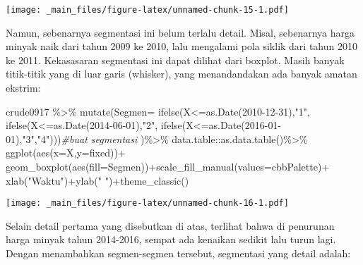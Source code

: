 \documentclass[
]{book}
\newenvironment{Shaded}{\begin{snugshade}}{\end{snugshade}}
\newcommand{\AttributeTok}[1]{\textcolor[rgb]{0.77,0.63,0.00}{#1}}
\newcommand{\CommentTok}[1]{\textcolor[rgb]{0.56,0.35,0.01}{\textit{#1}}}
\newcommand{\FunctionTok}[1]{\textcolor[rgb]{0.00,0.00,0.00}{#1}}
\newcommand{\NormalTok}[1]{#1}
\newcommand{\SpecialCharTok}[1]{\textcolor[rgb]{0.00,0.00,0.00}{#1}}
\newcommand{\StringTok}[1]{\textcolor[rgb]{0.31,0.60,0.02}{#1}}
\begin{document}
\texttt{[image: \_main\_files/figure-latex/unnamed-chunk-15-1.pdf]}

Namun, sebenarnya segmentasi ini belum terlalu detail. Misal, sebenarnya harga minyak naik dari tahun 2009 ke 2010, lalu mengalami pola siklik dari tahun 2010 ke 2011. Kekasasaran segmentasi ini dapat dilihat dari boxplot. Masih banyak titik-titik yang di luar garis (whisker), yang menandandakan ada banyak amatan ekstrim:

\begin{Shaded}
\begin{Highlighting}[]
\NormalTok{crude0917 }\SpecialCharTok{\%\textgreater{}\%}
  \FunctionTok{mutate}\NormalTok{(}\AttributeTok{Segmen=}
           \FunctionTok{ifelse}\NormalTok{(X}\SpecialCharTok{\textless{}=}\FunctionTok{as.Date}\NormalTok{(}\StringTok{\textquotesingle{}2010{-}12{-}31\textquotesingle{}}\NormalTok{),}\StringTok{"1"}\NormalTok{,}
           \FunctionTok{ifelse}\NormalTok{(X}\SpecialCharTok{\textless{}=}\FunctionTok{as.Date}\NormalTok{(}\StringTok{\textquotesingle{}2014{-}06{-}01\textquotesingle{}}\NormalTok{),}\StringTok{"2"}\NormalTok{,}
           \FunctionTok{ifelse}\NormalTok{(X}\SpecialCharTok{\textless{}=}\FunctionTok{as.Date}\NormalTok{(}\StringTok{\textquotesingle{}2016{-}01{-}01\textquotesingle{}}\NormalTok{),}\StringTok{"3"}\NormalTok{,}\StringTok{"4"}\NormalTok{)))}\CommentTok{\#buat segmentasi }
\NormalTok{  )}\SpecialCharTok{\%\textgreater{}\%}\NormalTok{ data.table}\SpecialCharTok{::}\FunctionTok{as.data.table}\NormalTok{()}\SpecialCharTok{\%\textgreater{}\%}
  \FunctionTok{ggplot}\NormalTok{(}\FunctionTok{aes}\NormalTok{(}\AttributeTok{x=}\NormalTok{X,}\AttributeTok{y=}\NormalTok{fixed))}\SpecialCharTok{+}
    \FunctionTok{geom\_boxplot}\NormalTok{(}\FunctionTok{aes}\NormalTok{(}\AttributeTok{fill=}\NormalTok{Segmen))}\SpecialCharTok{+}\FunctionTok{scale\_fill\_manual}\NormalTok{(}\AttributeTok{values=}\NormalTok{cbbPalette)}\SpecialCharTok{+}
    \FunctionTok{xlab}\NormalTok{(}\StringTok{"Waktu"}\NormalTok{)}\SpecialCharTok{+}\FunctionTok{ylab}\NormalTok{(}\StringTok{" "}\NormalTok{)}\SpecialCharTok{+}\FunctionTok{theme\_classic}\NormalTok{()}
\end{Highlighting}
\end{Shaded}

\texttt{[image: \_main\_files/figure-latex/unnamed-chunk-16-1.pdf]}

Selain detail pertama yang disebutkan di atas, terlihat bahwa di penurunan harga minyak tahun 2014-2016, sempat ada kenaikan sedikit lalu turun lagi. Dengan menambahkan segmen-segmen tersebut, segmentasi yang detail adalah:
\end{document}
